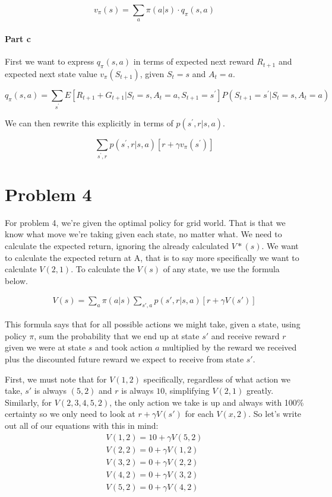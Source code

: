 \documentclass[12pt]{article}
\begin{document}
$$
  v_\pi(s) = \sum_a \pi(a | s) \cdot q_\pi(s, a)
$$

\paragraph{Part c} First we want to express $q_\pi(s, a)$ in terms of expected next reward $R_{t+1}$ and expected next state value $v_\pi(S_{t+1})$, given $S_t = s$ and $A_t = a$.

$$
  q_\pi(s, a) = \sum_{s^\prime} E[R_{t+1} + G_{t+1} | S_t = s, A_t = a, S_{t+1} = s^\prime] P(S_{t+1} = s^\prime | S_t = s, A_t = a)
$$

We can then rewrite this explicitly in terms of $p(s^\prime, r | s, a)$.

$$
  \sum_{s^\prime, r} p(s^\prime, r | s, a)[r + \gamma v_\pi(s^\prime)]
$$

\section{Problem 4}
For problem 4, we're given the optimal policy for grid world. That is that we know what move we're taking given each state, no matter what. We need to calculate the expected return, ignoring the already calculated $V*(s)$. We want to calculate the expected return at A, that is to say more specifically we want to calculate $V(2,1)$. To calculate the $V(s)$ of any state, we use the formula below.

\begin{gather*}
  V(s) = \sum_a \pi(a|s) \sum_{s\prime, a} p(s\prime, r | s, a)[r + \gamma V(s\prime)]
\end{gather*}

This formula says that for all possible actions we might take, given a state, using policy $\pi$, sum the probability that we end up at state $s\prime$ and receive reward $r$ given we were at state $s$ and took action $a$ multiplied by the reward we received plus the discounted future reward we expect to receive from state $s\prime$.

First, we must note that for $V(1, 2)$ specifically, regardless of what action we take, $s\prime$ is always $(5, 2)$ and $r$ is always $10$, simplifying $V(2, 1)$ greatly. Similarly, for $V({2, 3, 4, 5}, 2)$, the only action we take is up and always with 100\% certainty so we only need to look at $r + \gamma V(s\prime)$ for each $V(x, 2)$.
So let's write out all of our equations with this in mind:
\begin{gather*}
  V(1, 2) = 10 + \gamma V(5, 2) \\
  V(2, 2) = 0 + \gamma V(1, 2) \\
  V(3, 2) = 0 + \gamma V(2, 2) \\
  V(4, 2) = 0 + \gamma V(3, 2) \\
  V(5, 2) = 0 + \gamma V(4, 2)
\end{gather*}
\end{document}
